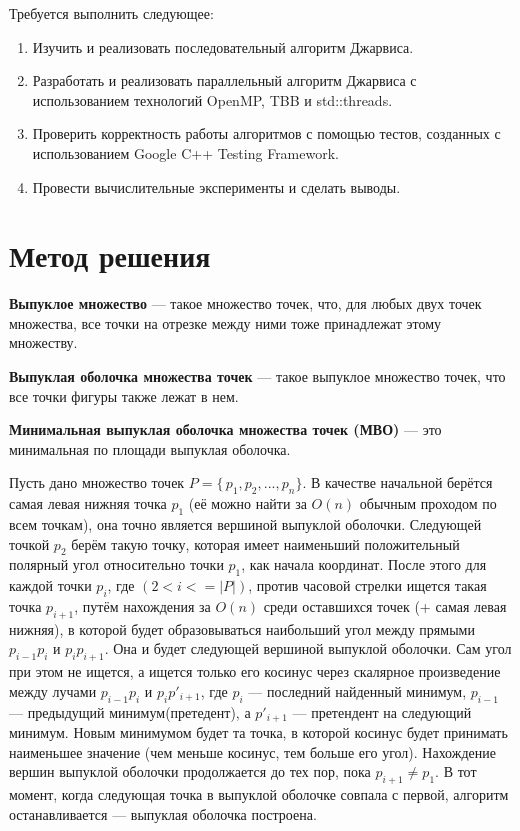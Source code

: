 \documentclass{report}
\begin{document}
\par Требуется выполнить следующее:

\begin{enumerate}
\item Изучить и реализовать последовательный алгоритм Джарвиса.
\item Разработать и реализовать параллельный алгоритм Джарвиса с использованием технологий OpenMP, TBB и std::threads.
\item Проверить корректность работы алгоритмов с помощью тестов, созданных с использованием Google C++ Testing Framework.
\item Провести вычислительные эксперименты и сделать выводы.
\end{enumerate}
\newpage

\section*{Метод решения}
\textbf{Выпуклое множество} — такое множество точек, что, для любых двух точек множества, все точки на отрезке между ними тоже принадлежат этому множеству.

\par \textbf{Выпуклая оболочка множества точек} — такое выпуклое множество точек, что все точки фигуры также лежат в нем.

\par \textbf{Минимальная выпуклая оболочка множества точек (МВО)} — это минимальная по площади выпуклая оболочка.

Пусть дано множество точек $P=\{\,p_1, p_2, ..., p_n\}$. В качестве начальной берётся самая левая нижняя точка $p_1$ (её можно найти за $O(n)$ обычным проходом по всем точкам), она точно является вершиной выпуклой оболочки. Следующей точкой  $p_2$ берём такую точку, которая имеет наименьший положительный полярный угол относительно точки $p_1$, как начала координат. После этого для каждой точки $p_i$, где $(2<i<=|P|)$, против часовой стрелки ищется такая точка $p_{i+1}$, путём нахождения за $O(n)$ среди оставшихся точек (+ самая левая нижняя), в которой будет образовываться наибольший угол между прямыми $p_{i-1} p_i$ и $p_{i}p_{i+1}$. Она и будет следующей вершиной выпуклой оболочки. Сам угол при этом не ищется, а ищется только его косинус через скалярное произведение между лучами  $p_{i-1}p_{i}$ и $p_{i}p'_{i+1}$, где  $p_{i}$ — последний найденный минимум,  $p_{i-1}$ — предыдущий минимум(претедент), а $p'_{i+1}$ — претендент на следующий минимум. Новым минимумом будет та точка, в которой косинус будет принимать наименьшее значение (чем меньше косинус, тем больше его угол). Нахождение вершин выпуклой оболочки продолжается до тех пор, пока $p_{i+1}\neq p_{1}$. В тот момент, когда следующая точка в выпуклой оболочке совпала с первой, алгоритм останавливается — выпуклая оболочка построена.
\end{document}
